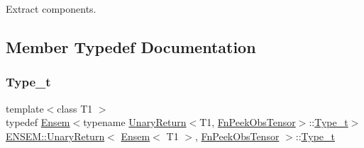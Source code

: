 Extract components. 

\subsection{Member Typedef Documentation}
\mbox{\label{structENSEM_1_1UnaryReturn_3_01Ensem_3_01T1_01_4_00_01FnPeekObsTensor_01_4_a6f60fb6656ccc4fbc31cc64aa1face1f}} 
\subsubsection{\texorpdfstring{Type\_t}{Type\_t}\hspace{0.1cm}{\footnotesize\ttfamily [1/2]}}
{\footnotesize\ttfamily template$<$class T1 $>$ \\
typedef \mbox{\hyperlink{classENSEM_1_1Ensem}{Ensem}}$<$typename \mbox{\hyperlink{structENSEM_1_1UnaryReturn}{Unary\+Return}}$<$T1, \mbox{\hyperlink{structENSEM_1_1FnPeekObsTensor}{Fn\+Peek\+Obs\+Tensor}}$>$\+::\mbox{\hyperlink{structENSEM_1_1UnaryReturn_3_01Ensem_3_01T1_01_4_00_01FnPeekObsTensor_01_4_a6f60fb6656ccc4fbc31cc64aa1face1f}{Type\+\_\+t}}$>$ \mbox{\hyperlink{structENSEM_1_1UnaryReturn}{E\+N\+S\+E\+M\+::\+Unary\+Return}}$<$ \mbox{\hyperlink{classENSEM_1_1Ensem}{Ensem}}$<$ T1 $>$, \mbox{\hyperlink{structENSEM_1_1FnPeekObsTensor}{Fn\+Peek\+Obs\+Tensor}} $>$\+::\mbox{\hyperlink{structENSEM_1_1UnaryReturn_3_01Ensem_3_01T1_01_4_00_01FnPeekObsTensor_01_4_a6f60fb6656ccc4fbc31cc64aa1face1f}{Type\+\_\+t}}}

\mbox{\label{structENSEM_1_1UnaryReturn_3_01Ensem_3_01T1_01_4_00_01FnPeekObsTensor_01_4_a6f60fb6656ccc4fbc31cc64aa1face1f}} 
